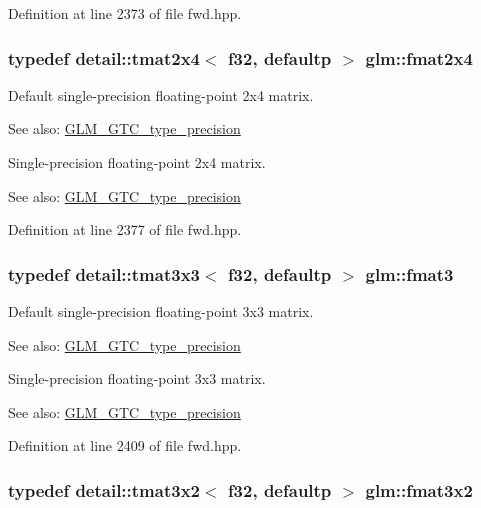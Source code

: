 Definition at line 2373 of file fwd.hpp.\hypertarget{group__gtc__type__precision_gf3af7a2f10aaf8028a95b7232b24d84e}{
\subsubsection[fmat2x4]{\setlength{\rightskip}{0pt plus 5cm}typedef detail::tmat2x4$<$ f32, defaultp $>$ {\bf glm::fmat2x4}}}
\label{group__gtc__type__precision_gf3af7a2f10aaf8028a95b7232b24d84e}


Default single-precision floating-point 2x4 matrix. \begin{Desc}
\item[See also:]\hyperlink{group__gtc__type__precision}{GLM\_\-GTC\_\-type\_\-precision}\end{Desc}
Single-precision floating-point 2x4 matrix. \begin{Desc}
\item[See also:]\hyperlink{group__gtc__type__precision}{GLM\_\-GTC\_\-type\_\-precision} \end{Desc}


Definition at line 2377 of file fwd.hpp.\hypertarget{group__gtc__type__precision_ga7b09502b183884aca53338c35b09509}{
\subsubsection[fmat3]{\setlength{\rightskip}{0pt plus 5cm}typedef detail::tmat3x3$<$ f32, defaultp $>$ {\bf glm::fmat3}}}
\label{group__gtc__type__precision_ga7b09502b183884aca53338c35b09509}


Default single-precision floating-point 3x3 matrix. \begin{Desc}
\item[See also:]\hyperlink{group__gtc__type__precision}{GLM\_\-GTC\_\-type\_\-precision}\end{Desc}
Single-precision floating-point 3x3 matrix. \begin{Desc}
\item[See also:]\hyperlink{group__gtc__type__precision}{GLM\_\-GTC\_\-type\_\-precision} \end{Desc}


Definition at line 2409 of file fwd.hpp.\hypertarget{group__gtc__type__precision_g723b6e3dd4ff1c0d76d3c9f72ea0d9a7}{
\subsubsection[fmat3x2]{\setlength{\rightskip}{0pt plus 5cm}typedef detail::tmat3x2$<$ f32, defaultp $>$ {\bf glm::fmat3x2}}}
\label{group__gtc__type__precision_g723b6e3dd4ff1c0d76d3c9f72ea0d9a7}


